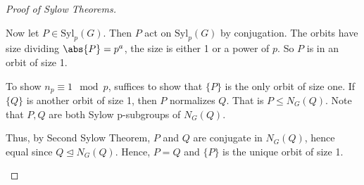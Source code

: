 \begin{proof}[Proof of Sylow Theorems]
\begin{enumerate}
        Now let \(P \in \mathrm{Syl}_p(G)\). Then \(P\) act on \(\mathrm{Syl}_p(G)\) by conjugation. The orbits have size dividing \(\abs{P} = p^a\), the size is either 1 or a power of \(p\). So \(P\) is in an orbit of size 1.

        To show \(n_p \equiv 1 \mod p\), suffices to show that \(\{P\}\) is the only orbit of size one. If \(\{Q\}\) is another orbit of size 1, then \(P\) normalizes \(Q\). That is \(P \leq N_G(Q)\). Note that \(P,Q\) are both Sylow p-subgroups of \(N_G(Q)\).

        Thus, by Second Sylow Theorem, \(P\) and \(Q\) are conjugate in \(N_G(Q)\), hence equal since \(Q \trianglelefteq N_G(Q)\). Hence, \(P = Q\) and \(\{P\}\) is the unique orbit of size 1.
    \end{enumerate}
\end{proof}